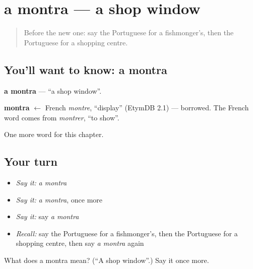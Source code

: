 \section[a montra]{a montra — a shop window}

\label{lesson:PT-C227-montra}



\begin{quote}
Before the new one: say the Portuguese for a fishmonger's, then the Portuguese for a shopping centre.
\end{quote}

\subsection*{You'll want to know: a montra}
\textbf{a montra} — \textquotedblleft{}a shop window\textquotedblright{}.

\begin{cousinweb}
\textbf{montra} $\leftarrow$ French \emph{montre}, \textquotedblleft{}display\textquotedblright{} (EtymDB 2.1) — borrowed. The French word comes from \emph{montrer}, \textquotedblleft{}to show\textquotedblright{}.
\end{cousinweb}

\begin{grammarlens}[title={What you've built}]
One more word for this chapter.
\end{grammarlens}

\subsection*{Your turn}
\begin{itemize}
\raggedright
  \item \emph{Say it:} \emph{a montra}
  \item \emph{Say it:} \emph{a montra}, once more
  \item \emph{Say it:} say \emph{a montra}
  \item \emph{Recall:} say the Portuguese for a fishmonger's, then the Portuguese for a shopping centre, then say \emph{a montra} again
\end{itemize}

\begin{tcolorbox}[breakable,colback=teal!4,colframe=teal!35!black,title={Before you move on}]
What does a montra mean? (\textquotedblleft{}A shop window\textquotedblright{}.) Say it once more.
\end{tcolorbox}
